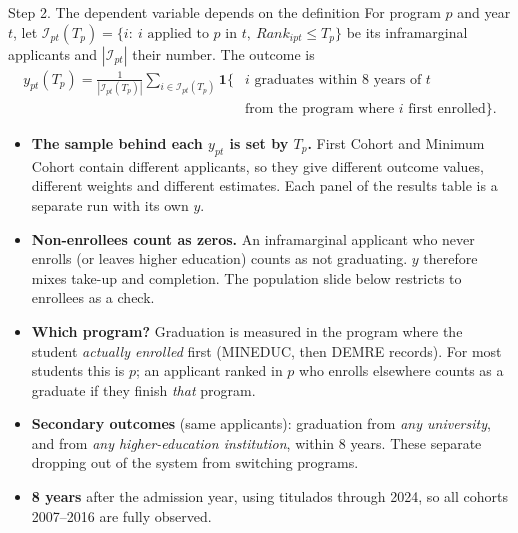 \documentclass{beamer}
\begin{document}
\begin{frame}{Step 2. The dependent variable depends on the definition}
\scriptsize
For program $p$ and year $t$, let $\mathcal I_{pt}(T_p)=\{i:\ i \text{ applied to } p \text{ in } t,\ Rank_{ipt}\le T_p\}$ be its inframarginal applicants
and $|\mathcal I_{pt}|$ their number. The outcome is
\[
\begin{aligned}
y_{pt}(T_p)=\frac{1}{|\mathcal I_{pt}(T_p)|}\sum_{i\in\mathcal I_{pt}(T_p)} \mathbf 1\{&i \text{ graduates within 8 years of } t\\
&\text{from the program where } i \text{ first enrolled}\}.
\end{aligned}
\]
\begin{itemize}
    \item \textbf{The sample behind each $y_{pt}$ is set by $T_p$.} First Cohort and Minimum Cohort contain different applicants,
    so they give different outcome values, different weights and different estimates. Each panel of the results table is a
    separate run with its own $y$.
    \item \textbf{Non-enrollees count as zeros.} An inframarginal applicant who never enrolls (or leaves higher education) counts as not graduating.
    $y$ therefore mixes take-up and completion. The population slide below restricts to enrollees as a check.
    \item \textbf{Which program?} Graduation is measured in the program where the student \emph{actually enrolled} first (MINEDUC, then DEMRE records).
    For most students this is $p$; an applicant ranked in $p$ who enrolls elsewhere counts as a graduate if they finish \emph{that} program.
    \item \textbf{Secondary outcomes} (same applicants): graduation from \emph{any university}, and from \emph{any higher-education institution}, within 8 years.
    These separate dropping out of the system from switching programs.
    \item \textbf{8 years} after the admission year, using titulados through 2024, so all cohorts 2007--2016 are fully observed.
\end{itemize}
\end{frame}
\end{document}
